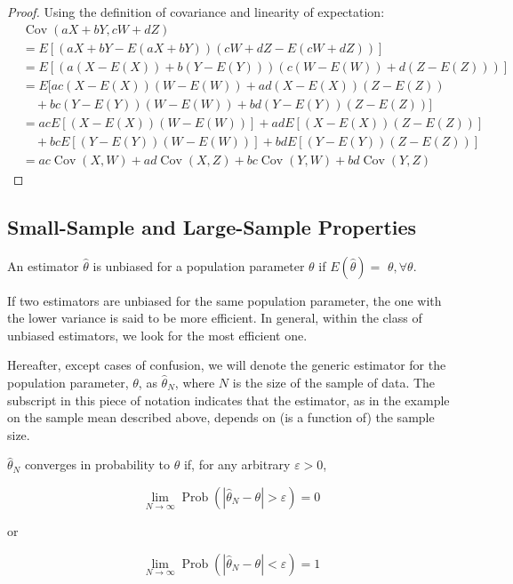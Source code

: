 \begin{proof}
        Using the definition of covariance and linearity of expectation:
        \[ \begin{aligned}
        &\operatorname{Cov}(aX + bY, cW + dZ) \\
        &= E[(aX + bY - E(aX + bY))(cW + dZ - E(cW + dZ))] \\
        &= E[(a(X - E(X)) + b(Y - E(Y)))(c(W - E(W)) + d(Z - E(Z)))] \\
        &= E[ac(X - E(X))(W - E(W)) + ad(X - E(X))(Z - E(Z)) \\
        &\quad + bc(Y - E(Y))(W - E(W)) + bd(Y - E(Y))(Z - E(Z))] \\
        &= acE[(X - E(X))(W - E(W))] + adE[(X - E(X))(Z - E(Z))] \\
        &\quad + bcE[(Y - E(Y))(W - E(W))] + bdE[(Y - E(Y))(Z - E(Z))] \\
        &= ac\operatorname{Cov}(X,W) + ad\operatorname{Cov}(X,Z) + bc\operatorname{Cov}(Y,W) + bd\operatorname{Cov}(Y,Z)
        \end{aligned} \]
    \end{proof}

\subsection{Small-Sample and Large-Sample Properties}

\begin{definition}[Unbiasedness]
    An estimator $\widehat{\theta}$ is unbiased for a population parameter $\theta$ if $E(\widehat{\theta})=$ $\theta, \forall \theta$.
\end{definition} 

If two estimators are unbiased for the same population parameter, the one with the lower variance is said to be more efficient. In general, within the class of unbiased estimators, we look for the most efficient one.

Hereafter, except cases of confusion, we will denote the generic estimator for the population parameter, $\theta$, as $\widehat{\theta}_{N}$, where $N$ is the size of the sample of data. The subscript in this piece of notation indicates that the estimator, as in the example on the sample mean described above, depends on (is a function of) the sample size.

\begin{definition}
     $\widehat{\theta}_{N}$ converges in probability to $\theta$ if, for any arbitrary $\varepsilon>0$,

     $$
    \lim _{N \rightarrow \infty} \operatorname{Prob}\left(\left|\widehat{\theta}_{N}-\theta\right|>\varepsilon\right)=0
    $$
    
    or
    
    $$
    \lim _{N \rightarrow \infty} \operatorname{Prob}\left(\left|\widehat{\theta}_{N}-\theta\right|<\varepsilon\right)=1
    $$
\end{definition}


